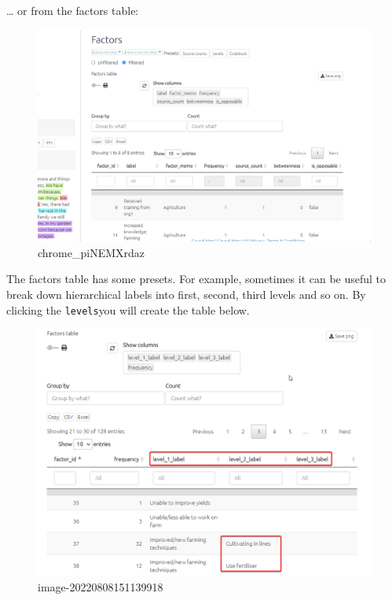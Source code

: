 \documentclass[
]{book}
\begin{document}
\ldots{} or from the factors table:

\begin{figure}
\centering
\includegraphics[width=6.77083in,height=\textheight]{_assets/chrome_piNEMXrdaz.gif}
\caption{chrome\_piNEMXrdaz}
\end{figure}

The factors table has some presets. For example, sometimes it can be useful to break down hierarchical labels into first, second, third levels and so on. By clicking the \texttt{levels}you will create the table below.

\begin{figure}
\centering
\includegraphics[width=6.77083in,height=\textheight]{_assets/image-20220808151139918.png}
\caption{image-20220808151139918}
\end{figure}
\end{document}
